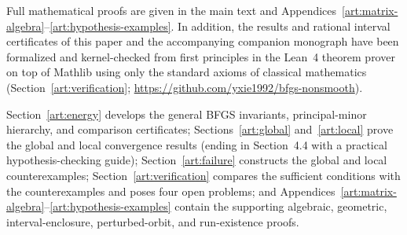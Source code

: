 Full mathematical proofs are given in the main text and
Appendices~\ref{art:matrix-algebra}--\ref{art:hypothesis-examples}. In addition,
the results and rational interval certificates of this paper and the
accompanying companion monograph have been formalized and kernel-checked from
first principles in the Lean~4 theorem prover on top of \textsf{Mathlib} using
only the standard axioms of classical mathematics (Section~\ref{art:verification};
\url{https://github.com/yxie1992/bfgs-nonsmooth}).

Section~\ref{art:energy} develops the general BFGS invariants, principal-minor
hierarchy, and comparison certificates; Sections~\ref{art:global}
and~\ref{art:local} prove the global and local convergence results (ending in
Section~4.4 with a practical hypothesis-checking guide); Section~\ref{art:failure}
constructs the global and local counterexamples; Section~\ref{art:verification}
compares the sufficient conditions with the counterexamples and poses four open
problems; and Appendices~\ref{art:matrix-algebra}--\ref{art:hypothesis-examples}
contain the supporting algebraic, geometric, interval-enclosure, perturbed-orbit,
and run-existence proofs.

